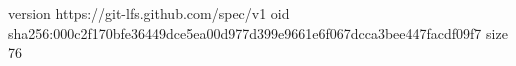 version https://git-lfs.github.com/spec/v1
oid sha256:000c2f170bfe36449dce5ea00d977d399e9661e6f067dcca3bee447facdf09f7
size 76
